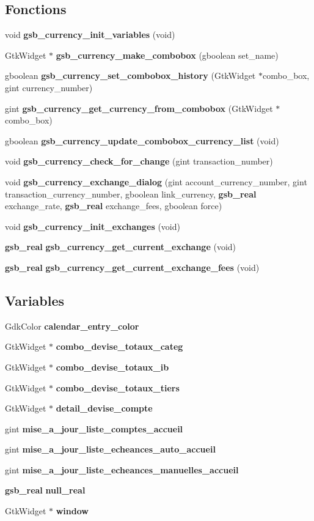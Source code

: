\subsection*{Fonctions}
\begin{DoxyCompactItemize}
\item 
void {\bf gsb\_\-currency\_\-init\_\-variables} (void)
\item 
GtkWidget $\ast$ {\bf gsb\_\-currency\_\-make\_\-combobox} (gboolean set\_\-name)
\item 
gboolean {\bf gsb\_\-currency\_\-set\_\-combobox\_\-history} (GtkWidget $\ast$combo\_\-box, gint currency\_\-number)
\item 
gint {\bf gsb\_\-currency\_\-get\_\-currency\_\-from\_\-combobox} (GtkWidget $\ast$combo\_\-box)
\item 
gboolean {\bf gsb\_\-currency\_\-update\_\-combobox\_\-currency\_\-list} (void)
\item 
void {\bf gsb\_\-currency\_\-check\_\-for\_\-change} (gint transaction\_\-number)
\item 
void {\bf gsb\_\-currency\_\-exchange\_\-dialog} (gint account\_\-currency\_\-number, gint transaction\_\-currency\_\-number, gboolean link\_\-currency, {\bf gsb\_\-real} exchange\_\-rate, {\bf gsb\_\-real} exchange\_\-fees, gboolean force)
\item 
void {\bf gsb\_\-currency\_\-init\_\-exchanges} (void)
\item 
{\bf gsb\_\-real} {\bf gsb\_\-currency\_\-get\_\-current\_\-exchange} (void)
\item 
{\bf gsb\_\-real} {\bf gsb\_\-currency\_\-get\_\-current\_\-exchange\_\-fees} (void)
\end{DoxyCompactItemize}
\subsection*{Variables}
\begin{DoxyCompactItemize}
\item 
GdkColor {\bf calendar\_\-entry\_\-color}
\item 
GtkWidget $\ast$ {\bf combo\_\-devise\_\-totaux\_\-categ}
\item 
GtkWidget $\ast$ {\bf combo\_\-devise\_\-totaux\_\-ib}
\item 
GtkWidget $\ast$ {\bf combo\_\-devise\_\-totaux\_\-tiers}
\item 
GtkWidget $\ast$ {\bf detail\_\-devise\_\-compte}
\item 
gint {\bf mise\_\-a\_\-jour\_\-liste\_\-comptes\_\-accueil}
\item 
gint {\bf mise\_\-a\_\-jour\_\-liste\_\-echeances\_\-auto\_\-accueil}
\item 
gint {\bf mise\_\-a\_\-jour\_\-liste\_\-echeances\_\-manuelles\_\-accueil}
\item 
{\bf gsb\_\-real} {\bf null\_\-real}
\item 
GtkWidget $\ast$ {\bf window}
\end{DoxyCompactItemize}


